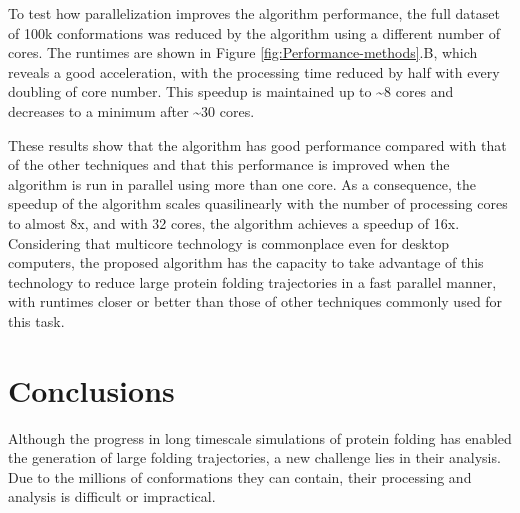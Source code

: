 \documentclass[twocolumn]{bmcart}%
\begin{document}

To test how parallelization improves the algorithm performance, the full dataset of 100k conformations was reduced by the algorithm using a different number of cores. The runtimes are shown in Figure \ref{fig:Performance-methods}.B, which reveals a good acceleration, with the processing time reduced by half with every doubling of core number. This speedup is maintained up to \textasciitilde{}8 cores and decreases to a minimum after \textasciitilde{}30 cores.

These results show that the algorithm has good performance compared with that of the other techniques and that this performance is improved when the algorithm is run in parallel using more than one core. As a consequence, the speedup of the algorithm scales quasilinearly with the number of processing cores to almost 8x, and with 32 cores, the algorithm achieves a speedup of 16x. Considering that multicore technology is commonplace even for desktop computers, the proposed algorithm has the capacity to take advantage of this technology to reduce large protein folding trajectories in a fast parallel manner, with runtimes closer or better than those of other techniques commonly used for this task.


\section*{Conclusions}

Although the progress in long timescale simulations of protein folding has enabled the generation of large folding trajectories, a new challenge lies in their analysis. Due to the millions of conformations they can contain, their processing and analysis is difficult or impractical.
\end{document}
